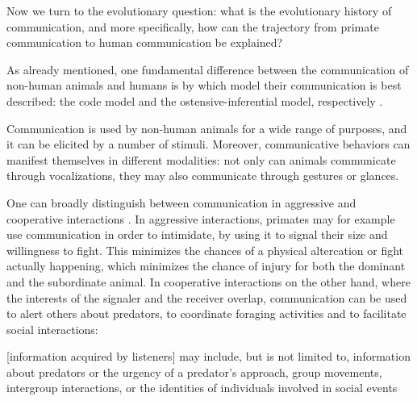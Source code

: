 Now we turn to the evolutionary question: what is the evolutionary history of communication, and more specifically, how can the trajectory from primate communication to human communication be explained?

As already mentioned, one fundamental difference between the communication of non-human animals and humans is by which model their communication is best described: the code model and the ostensive-inferential model, respectively \citep{Scott-Phillips15-primate, Scott-Phillips18-communication}.

Communication is used by non-human animals for a wide range of purposes, and it can be elicited by a number of stimuli. Moreover, communicative behaviors can manifest themselves in different modalities: not only can animals communicate through vocalizations, they may also communicate through gestures or glances.

One can broadly distinguish between communication in aggressive and cooperative interactions \citep{SeyfarthCheney03}. In aggressive interactions, primates may for example use communication in order to intimidate, by using it to signal their size and willingness to fight. This minimizes the chances of a physical altercation or fight actually happening, which minimizes the chance of injury for both the dominant and the subordinate animal.
In cooperative interactions on the other hand, where the interests of the signaler and the receiver overlap, communication can be used to alert others about predators, to coordinate foraging activities and to facilitate social interactions:
\begin{quoting}
    {[information acquired by listeners]} may include, but is not limited to, information about predators or the urgency of a predator’s approach, group movements, intergroup interactions, or the identities of individuals involved in social events
    \hfill \citep[p.~168]{SeyfarthCheney03}
\end{quoting}

